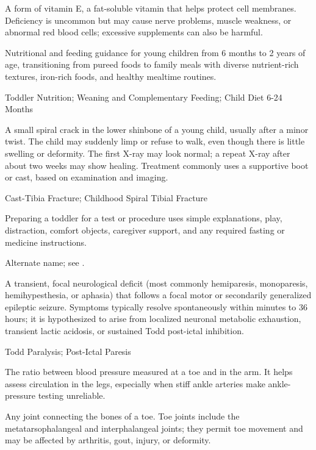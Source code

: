  A form of vitamin E, a fat-soluble vitamin that helps protect cell membranes. Deficiency is uncommon but may cause nerve problems, muscle weakness, or abnormal red blood cells; excessive supplements can also be harmful.

 Nutritional and feeding guidance for young children from 6 months to 2 years of age, transitioning from pureed foods to family meals with diverse nutrient-rich textures, iron-rich foods, and healthy mealtime routines.

\synonyms
Toddler Nutrition; Weaning and Complementary Feeding; Child Diet 6-24 Months

 A small spiral crack in the lower shinbone of a young child, usually after a minor twist. The child may suddenly limp or refuse to walk, even though there is little swelling or deformity. The first X-ray may look normal; a repeat X-ray after about two weeks may show healing. Treatment commonly uses a supportive boot or cast, based on examination and imaging.

\synonyms
Cast-Tibia Fracture; Childhood Spiral Tibial Fracture

 Preparing a toddler for a test or procedure uses simple explanations, play, distraction, comfort objects, caregiver support, and any required fasting or medicine instructions.

 Alternate name; see .

 A transient, focal neurological deficit (most commonly hemiparesis, monoparesis, hemihypesthesia, or aphasia) that follows a focal motor or secondarily generalized epileptic seizure. Symptoms typically resolve spontaneously within minutes to 36 hours; it is hypothesized to arise from localized neuronal metabolic exhaustion, transient lactic acidosis, or sustained Todd post-ictal inhibition.

\synonyms
Todd Paralysis; Post-Ictal Paresis

 The ratio between blood pressure measured at a toe and in the arm. It helps assess circulation in the legs, especially when stiff ankle arteries make ankle-pressure testing unreliable.

 Any joint connecting the bones of a toe. Toe joints include the metatarsophalangeal and interphalangeal joints; they permit toe movement and may be affected by arthritis, gout, injury, or deformity.

